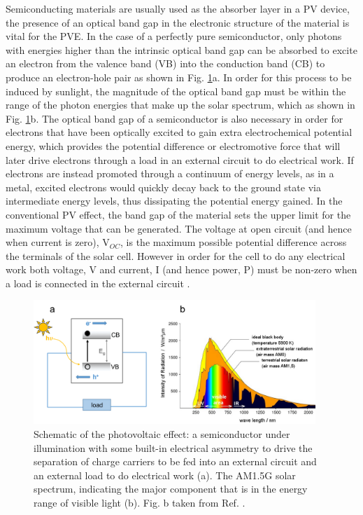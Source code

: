 \documentclass[11pt, twoside]{report}
\begin{document}
Semiconducting materials are usually used as the absorber layer in a PV device, the presence of an optical band gap in the electronic structure of the material is vital for the PVE. In the case of a perfectly pure semiconductor, only photons with energies higher than the intrinsic optical band gap can be absorbed to excite an electron from the valence band (VB) into the conduction band (CB) to produce an electron-hole pair as shown in Fig. \ref{PV_schematic}a. In order for this process to be induced by sunlight, the magnitude of the optical band gap must be within the range of the photon energies that make up the solar spectrum, which as shown in Fig. \ref{PV_schematic}b. The optical band gap of a semiconductor is also necessary in order for electrons that have been optically excited to gain extra electrochemical potential energy, which provides the potential difference or electromotive force that will later drive electrons through a load in an external circuit to do electrical work. If electrons are instead promoted through a continuum of energy levels, as in a metal, excited electrons would quickly decay back to the ground state via intermediate energy levels, thus dissipating the potential energy gained. In the conventional PV effect, the band gap of the material sets the upper limit for the maximum voltage that can be generated. The voltage at open circuit (and hence when current is zero), V$_{OC}$, is the maximum possible potential difference across the terminals of the solar cell. However in order for the cell to do any electrical work both voltage, V and current, I (and hence power, P) must be non-zero when a load is connected in the external circuit \cite{Nelson3}.

\begin{figure}[h!]
  \centering
    \includegraphics[width=0.95\textwidth]{figures/PV_schematic.png}
    \caption{Schematic of the photovoltaic effect: a semiconductor under illumination with some built-in electrical asymmetry to drive the separation of charge carriers to be fed into an external circuit and an external load to do electrical work (a). The AM1.5G solar spectrum, indicating the major component that is in the energy range of visible light (b). Fig. b taken from Ref. .}
  \label{PV_schematic}
\end{figure}
\end{document}
